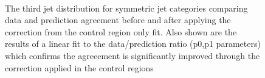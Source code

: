 \begin{figure}[tbhp]
    \begin{center}
         ~~
        \\
        \caption{The third jet \pt distribution for symmetric jet categories comparing data and prediction agreement before and after applying the correction from the control region only fit. Also shown are the results of a linear fit to the data/prediction ratio (p0,p1 parameters) which confirms the agreeement is significantly improved through the correction applied in the control regions}
    \end{center}
\end{figure}
